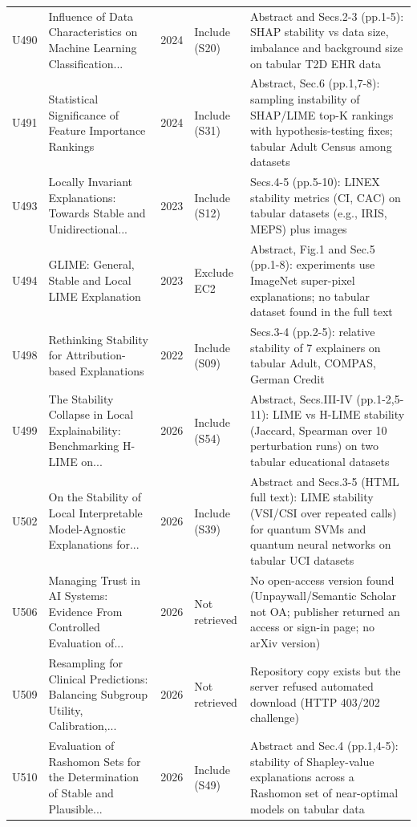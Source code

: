 \begin{longtable}{@{}P{1.0cm}P{6.3cm}P{0.7cm}P{1.6cm}P{6.1cm}@{}}
U490 & Influence of Data Characteristics on Machine Learning Classification... & 2024 & Include (S20) & Abstract and Secs.2-3 (pp.1-5): SHAP stability vs data size, imbalance and background size on tabular T2D EHR data \\
U491 & Statistical Significance of Feature Importance Rankings & 2024 & Include (S31) & Abstract, Sec.6 (pp.1,7-8): sampling instability of SHAP/\allowbreak{}LIME top-K rankings with hypothesis-testing fixes; tabular Adult Census among datasets \\
U493 & Locally Invariant Explanations: Towards Stable and Unidirectional... & 2023 & Include (S12) & Secs.4-5 (pp.5-10): LINEX stability metrics (CI, CAC) on tabular datasets (e.g., IRIS, MEPS) plus images \\
U494 & GLIME: General, Stable and Local LIME Explanation & 2023 & Exclude EC2 & Abstract, Fig.1 and Sec.5 (pp.1-8): experiments use ImageNet super-pixel explanations; no tabular dataset found in the full text \\
U498 & Rethinking Stability for Attribution-based Explanations & 2022 & Include (S09) & Secs.3-4 (pp.2-5): relative stability of 7 explainers on tabular Adult, COMPAS, German Credit \\
U499 & The Stability Collapse in Local Explainability: Benchmarking H-LIME on... & 2026 & Include (S54) & Abstract, Secs.III-IV (pp.1-2,5-11): LIME vs H-LIME stability (Jaccard, Spearman over 10 perturbation runs) on two tabular educational datasets \\
U502 & On the Stability of Local Interpretable Model-Agnostic Explanations for... & 2026 & Include (S39) & Abstract and Secs.3-5 (HTML full text): LIME stability (VSI/\allowbreak{}CSI over repeated calls) for quantum SVMs and quantum neural networks on tabular UCI datasets \\
U506 & Managing Trust in AI Systems: Evidence From Controlled Evaluation of... & 2026 & Not retrieved & No open-access version found (Unpaywall/\allowbreak{}Semantic Scholar not OA; publisher returned an access or sign-in page; no arXiv version) \\
U509 & Resampling for Clinical Predictions: Balancing Subgroup Utility, Calibration,... & 2026 & Not retrieved & Repository copy exists but the server refused automated download (HTTP 403/\allowbreak{}202 challenge) \\
U510 & Evaluation of Rashomon Sets for the Determination of Stable and Plausible... & 2026 & Include (S49) & Abstract and Sec.4 (pp.1,4-5): stability of Shapley-value explanations across a Rashomon set of near-optimal models on tabular data \\

\end{longtable}
